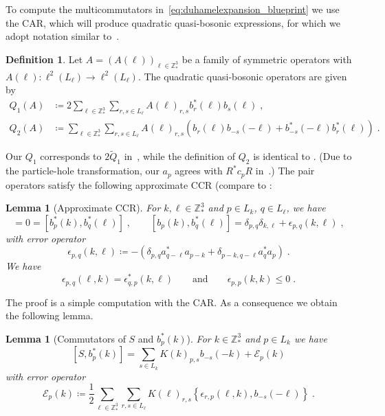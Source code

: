 \documentclass[12pt,a4paper]{article}
\numberwithin{equation}{section}
\newcommand{\1}{\mathbb{I}}
\newcommand{\Z}{\mathbb{Z}}
\theoremstyle{plain}
\newtheorem{lemma}[theorem]{Lemma}
\theoremstyle{definition}
\newtheorem{definition}[theorem]{Definition}
\theoremstyle{remark}
\theoremstyle{plain}
\theoremstyle{definition}
\theoremstyle{remark}
\begin{document}
To compute the multicommutators in~\eqref{eq:duhamelexpansion_blueprint} we use the CAR, which will produce quadratic quasi-bosonic expressions, for which we adopt notation similar to~\cite{CHN21}.

\begin{definition} \label{def:Q}
Let $A=(A(\ell))_{\ell \in \Z^3_*} $ be a family of symmetric operators with $A(\ell): \ell^2(L_\ell)\rightarrow \ell^2(L_\ell)$. The quadratic quasi-bosonic operators are given by
\begin{equation} \label{eq:Q}
\begin{aligned}
	Q_1(A)&\coloneq 2 \sum_{\ell \in \Z^3_*}\sum_{r,s \in L_{\ell}}A(\ell)_{r,s} b^*_r(\ell)b_{s}(\ell) \;,\\
	Q_2(A)&\coloneq \sum_{\ell \in \Z^3_*}\sum_{r,s \in L_{\ell}}A(\ell)_{r,s} \left(b_r(\ell)b_{-s}(-\ell)+b^*_{-s}(-\ell)b^*_{r}(\ell)\right) \;.
\end{aligned}
\end{equation} 
\end{definition}
Our $ Q_1 $ corresponds to $ 2 \tilde Q_1 $ in~\cite{CHN21}, while the definition of $ Q_2 $ is identical to \cite{CHN21}. (Due to the particle-hole transformation, our $ a_p $ agrees with $ R^* c_p R $ in~\cite{CHN21,CHN23,CHN24}.) The pair operators satisfy the following approximate CCR (compare to \cite[(1.66)]{CHN21}:

\begin{lemma}[Approximate CCR]\label{lem:paircomm}
For $k,\ell \in \Z^3_*$ and $p \in L_{k}$, $q\in L_{\ell}$, we have
\begin{equation}
	[b_{p}(k),b_{q}(\ell)]
	= 0 = [b^*_{p}(k),b^*_{q}(\ell)]  \;, \qquad
	[b_{p}(k),b^*_{q}(\ell)]
	= \delta_{p,q}\delta_{k,\ell} + \epsilon_{p,q}(k,\ell) \;,
\end{equation}
 with error operator
\begin{equation}
	\epsilon_{p,q}(k,\ell)
	\coloneq -\left(\delta_{p,q}a^*_{q-\ell}a_{p-k} + \delta_{p-k,q-\ell}a^*_{q}a_{p}\right) \;.
\end{equation}
We have
\begin{equation}
\epsilon_{p,q}(\ell,k) = \epsilon^*_{q,p}(k,\ell) \qquad \text{and} \qquad \epsilon_{p,p}(k,k)\leq 0 \;.
\end{equation}
\end{lemma}
The proof is a simple computation with the CAR. As a consequence we obtain the following lemma.

\begin{lemma}[Commutators of $S $ and $b^*_p(k)$]
For $k \in \Z^3_*$ and $p \in L_k$ we have
\begin{equation} \label{eq:comm_Kb}
	[S, b^*_p(k)]
	= \sum_{s\in L_{k}}K(k)_{p,s}b_{-s}(-k)
		+ \mathcal{E}_{p}(k)
\end{equation}
with error operator
\begin{equation}\label{eq:commerrKb}
	\mathcal{E}_{p}(k)
	\coloneq \frac{1}{2}\sum_{\ell\in \mathbb{Z}^3_*}\sum_{r,s\in L_\ell}K(\ell)_{r,s}\left\{\epsilon_{r,p}(\ell,k),b_{-s}(-\ell)\right\} \;.
\end{equation}
\end{lemma}
\end{document}

